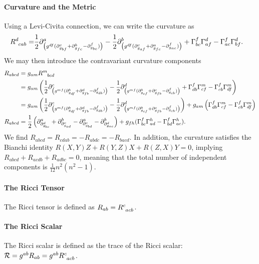 \paragraph{Curvature and the Metric}
Using a Levi-Civita connection, we can write the curvature as
\begin{align*}
	\tensor{R}{^{d}_{cab}} =& \frac{1}{2}\del{a}{\left(g^{df}(\del{c}{g_{bf}} + \del{b}{g_{fc}} - \del{f}{g_{bc}})\right)} - \frac{1}{2}\del{b}{\left(g^{df}(\del{c}{g_{af}} + \del{a}{g_{fc}} - \del{f}{g_{ac}})\right)} + \chris{f}{b}{c}\chris{d}{a}{f} - \chris{f}{a}{c}\chris{d}{b}{f}.
\end{align*}
We may then introduce the contravariant curvature components
\begin{align*}
	R_{abcd} &= g_{am}\tensor{R}{^{m}_{bcd}} \\
	         &= g_{am}\left(\frac{1}{2}\del{c}{\left(g^{mf}(\del{b}{g_{df}} + \del{d}{g_{fb}} - \del{f}{g_{db}})\right)} - \frac{1}{2}\del{d}{\left(g^{mf}(\del{b}{g_{cf}} + \del{c}{g_{fb}} - \del{f}{g_{cb}})\right)} + \chris{f}{d}{b}\chris{m}{c}{f} - \chris{f}{c}{b}\chris{m}{d}{f}\right) \\
	         &= g_{am}\left(\frac{1}{2}\del{c}{\left(g^{mf}(\del{b}{g_{df}} + \del{d}{g_{fb}} - \del{f}{g_{db}})\right)} - \frac{1}{2}\del{d}{\left(g^{mf}(\del{b}{g_{cf}} + \del{c}{g_{fb}} - \del{f}{g_{cb}})\right)}\right) + g_{am}\left(\chris{f}{d}{b}\chris{m}{c}{f} - \chris{f}{c}{b}\chris{m}{d}{f}\right) \\
	R_{abcd} &= \frac{1}{2}\left(\del{a}{\del{d}{g_{bc}}} + \del{b}{\del{c}{g_{ad}}} - \del{a}{\del{c}{g_{bd}}} - \del{b}{\del{d}{g_{ac}}}\right) + g_{fh}(\chris{f}{b}{c}\chris{h}{a}{d} - \chris{f}{b}{d}\chris{h}{a}{c}).
\end{align*}
We find $R_{abcd} = R_{cdab} = -R_{abdc} = -R_{bacd}$. In addition, the curvature satisfies the Bianchi identity $R(X, Y)Z + R(Y, Z)X + R(Z, X)Y = 0$, implying $R_{abcd} + R_{acdb} + R_{adbc} = 0$, meaning that the total number of independent components is $\frac{1}{12}n^{2}(n^{2} - 1)$.

\paragraph{The Ricci Tensor}
The Ricci tensor is defined as $R_{ab} = \tensor{R}{^{c}_{acb}}$.

\paragraph{The Ricci Scalar}
The Ricci scalar is defined as the trace of the Ricci scalar: $\mathcal{R} = g^{ab}R_{ab} = g^{ab}\tensor{R}{^{c}_{acb}}$.


